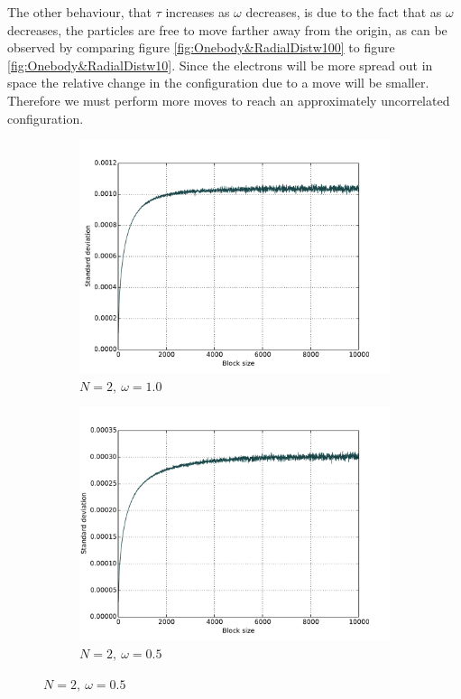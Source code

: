 \documentclass[english, a4paper]{article}
\begin{document}
	The other behaviour, that $\tau$ increases as $\omega$ decreases, is due to the fact that as $\omega$ decreases, the particles are free to move farther away from the origin, as can be observed by comparing figure \ref{fig:Onebody&RadialDistw100} to figure \ref{fig:Onebody&RadialDistw10}. Since the electrons will be more spread out in space the relative change in the configuration due to a move will be smaller. Therefore we must perform more moves to reach an approximately uncorrelated configuration.                                                                                                                                                                                                                                                       
	
		\begin{figure}[H]
			
			\begin{subfigure}{0.5\textwidth}
				\includegraphics[width=\linewidth]{figures/blocking/filipN2w100.pdf}
				\caption{$N=2,\:\omega=1.0$}
				\label{fig:blockingN2w100}
			\end{subfigure}
			\begin{subfigure}{0.5\textwidth}
				\includegraphics[width=\linewidth]{figures/blocking/filipN2w50.pdf}
				\caption{$N=2,\:\omega=0.5$}
				\label{fig:blockingN2w50}
			\end{subfigure}
			

\end{figure}
\end{document}
